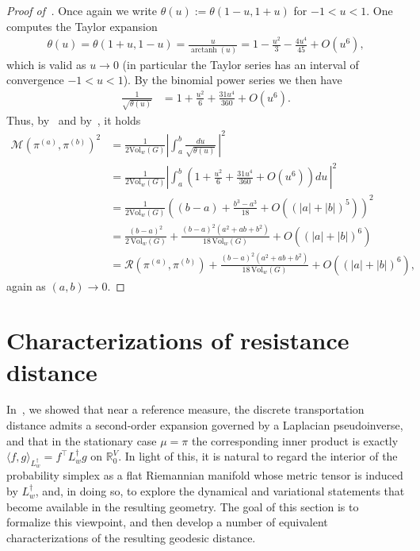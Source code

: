 \documentclass[11pt,a4paper]{article}
\newcommand{\Maas}{\mathcal{M}}
\newcommand{\Resis}{\mathcal{R}}
\newcommand{\Vol}{\mathrm{Vol}}
\begin{document}
\begin{proof}[Proof of~]
    Once again we write $\theta(u) := \theta(1-u, 1+u)$ for $-1<u<1$. One computes the Taylor expansion
        \begin{align*}
            \theta(u)=\theta(1+u,1-u)=\frac{u}{\operatorname{arctanh}(u)}
            = 1-\frac{u^2}{3}-\frac{4u^4}{45}+O(u^6),
        \end{align*}
    which is valid as $u\to 0$ (in particular the Taylor series has an interval of convergence $-1<u<1$). By the binomial power series we then have
        \begin{align*}
            \frac{1}{\sqrt{\theta(u)}}
            &= 1+\frac{u^2}{6}+\frac{31u^4}{360}+O(u^6).
        \end{align*}
    Thus, by~ and by~, it holds
        \begin{align*}
            \Maas(\pi^{(a)},\pi^{(b)})^2 &= \frac{1}{2\Vol_w(G)} \left| \int_a^{b} \frac{du}{\sqrt{\theta(u)}}\,\right|^2\\
            &= \frac{1}{2\Vol_w(G)} \left| \int_a^{b} \left(1+\frac{u^2}{6}+\frac{31u^4}{360}+O(u^6)\right) du\,\right|^2\\
            &= \frac{1}{2\Vol_w(G)}\left((b-a)+\frac{b^3-a^3}{18}+O((|a|+|b|)^5)\right)^2\\
            &= \frac{(b-a)^2}{2\,\Vol_w(G)} + \frac{(b-a)^2(a^2+ab+b^2)}{18\,\Vol_w(G)} + O((|a|+|b|)^6)\\
            &= \Resis(\pi^{(a)},\pi^{(b)}) + \frac{(b-a)^2(a^2+ab+b^2)}{18\,\Vol_w(G)} + O((|a|+|b|)^6),
        \end{align*}
    again as $(a,b) \to 0$.
\end{proof}

\section{Characterizations of resistance distance}\label{sec:characterizations}

In~, we showed that near a reference measure, the discrete transportation distance admits a second-order expansion governed by a Laplacian pseudoinverse, and that in the stationary case $\mu=\pi$ the corresponding inner product is exactly $\langle f,g\rangle_{L_w^\dagger}=f^\top L_w^\dagger g$ on $\mathbb{R}^V_0$. In light of this, it is natural to regard the interior of the probability simplex as a flat Riemannian manifold whose metric tensor is induced by $L_w^\dagger$, and, in doing so, to explore the dynamical and variational statements that become available in the resulting geometry. The goal of this section is to formalize this viewpoint, and then develop a number of equivalent characterizations of the resulting geodesic distance.
\end{document}
